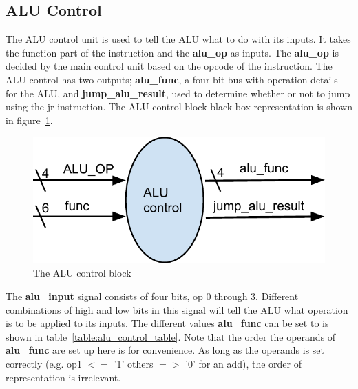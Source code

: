 \subsection{ALU Control}

The ALU control unit is used to tell the ALU what to do with its inputs. 
It takes the function part of the instruction and the {\bf alu\_op} as inputs. 
The {\bf alu\_op} is decided by the main control unit based on the opcode of the 
instruction. The ALU control has two outputs; {\bf alu\_func}, a four-bit bus with 
operation details for the ALU, and {\bf jump\_alu\_result}, used to determine 
whether or not to jump using the jr instruction. The ALU control block black box representation is 
shown in figure~\ref {fig:alu_control_block}.

\begin{figure}[h]
	\label{fig:alu_control_block}
	\includegraphics{figures/alu_control}
	\caption{The ALU control block}
\end{figure}

The {\bf alu\_input} signal consists of four bits, op 0 through 3. Different 
combinations of high and low bits in this signal will tell the ALU what 
operation is to be applied to its inputs.  The different values {\bf alu\_func} 
can be set to is shown in table~\ref{table:alu_control_table}. Note that the 
order the operands of {\bf alu\_func} are set up here is for convenience. As long 
as the operands is set correctly (e.g. op1 $<=$ '1' others $=>$ '0' for an 
add), the order of representation is irrelevant. 

